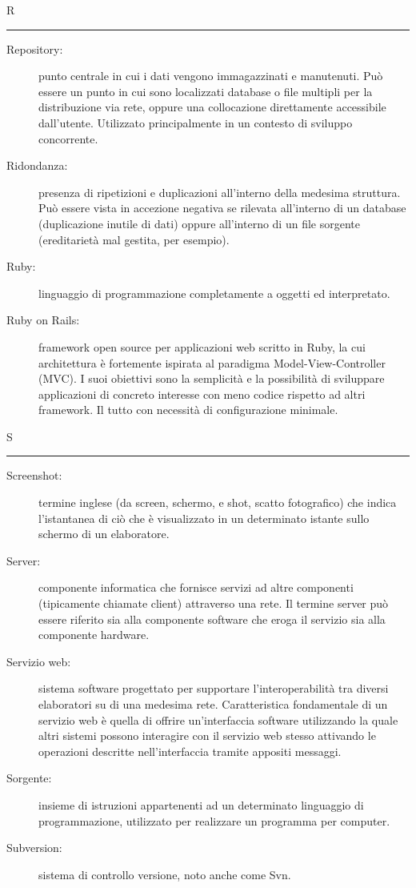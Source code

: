 \documentclass[11pt,a4paper]{article}
\begin{document}
\bigskip
\Huge R \bigskip
\hrule
\smallskip
\normalsize
\begin{description}
	\item[Repository:] punto centrale in cui i dati vengono immagazzinati e manutenuti. Può essere un punto in cui sono localizzati database o file multipli per la distribuzione via rete, oppure una collocazione direttamente accessibile dall'utente. Utilizzato principalmente in un contesto di sviluppo concorrente.
	\item[Ridondanza:] presenza di ripetizioni e duplicazioni all'interno della medesima struttura. Può essere vista in accezione negativa se rilevata all'interno di un database (duplicazione inutile di dati) oppure all'interno di un file sorgente (ereditarietà mal gestita, per esempio).
	\item[Ruby:] linguaggio di programmazione completamente a oggetti ed interpretato.
	\item[Ruby on Rails:] framework open source per applicazioni web scritto in Ruby, la cui architettura è fortemente ispirata al paradigma Model-View-Controller (MVC). I suoi obiettivi sono la semplicità e la possibilità di sviluppare applicazioni di concreto interesse con meno codice rispetto ad altri framework. Il tutto con necessità di configurazione minimale.
\end{description}
\bigskip
\Huge S \bigskip
\hrule
\smallskip
\normalsize
\begin{description}
	\item[Screenshot:] termine inglese (da screen, schermo, e shot, scatto fotografico) che indica l'istantanea di ciò che è visualizzato in un determinato istante sullo schermo di un elaboratore.
	\item[Server:] componente informatica che fornisce servizi ad altre componenti (tipicamente chiamate client) attraverso una rete. Il termine server può essere riferito sia alla componente software che eroga il servizio sia alla componente hardware.
	\item[Servizio web:] sistema software progettato per supportare l'interoperabilità tra diversi elaboratori su di una medesima rete. Caratteristica fondamentale di un servizio web è quella di offrire un'interfaccia software utilizzando la quale altri sistemi possono interagire con il servizio web stesso attivando le operazioni descritte nell'interfaccia tramite appositi messaggi.
	\item[Sorgente:] insieme di istruzioni appartenenti ad un determinato linguaggio di programmazione, utilizzato per realizzare un programma per computer.
	\item[Subversion:] sistema di controllo versione, noto anche come Svn.
\end{description}
\end{document}
